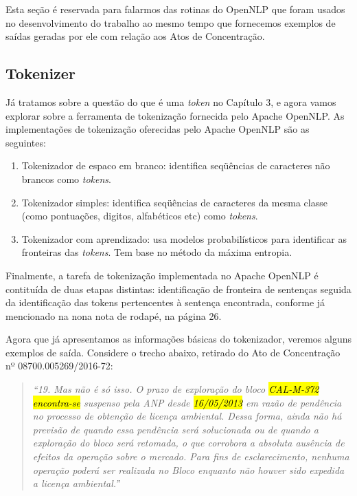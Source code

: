 \documentclass[11pt]{report}
\newcommand{\quotes}[1]{``#1''}
\begin{document}
Esta seção é reservada para falarmos das rotinas do OpenNLP que foram usados no desenvolvimento do trabalho
ao mesmo tempo que fornecemos exemplos de saídas geradas por ele com relação aos Atos de Concentração.


\subsection{Tokenizer}

\indent\indent Já tratamos sobre a questão do que é uma \textit{token} no Capítulo 3, e agora vamos explorar sobre a ferramenta de
tokenização fornecida pelo Apache OpenNLP. As implementações de tokenização oferecidas pelo Apache OpenNLP são as seguintes:

\begin{enumerate}[label=\textbf{{\Roman*.}}]
  \item Tokenizador de espaco em branco: identifica seqüências de caracteres não brancos como \textit{tokens}.
  \item Tokenizador simples: identifica seqüências de caracteres da mesma classe (como pontuações, digitos, alfabéticos etc) como \textit{tokens}.
  \item Tokenizador com aprendizado: usa modelos probabilísticos para identificar as fronteiras das \textit{tokens}. Tem base no método da máxima entropia.
\end{enumerate}

Finalmente, a tarefa de tokenização implementada no Apache OpenNLP é contituída de duas etapas distintas: identificação de fronteira de sentenças seguida da identificação das
tokens pertencentes à sentença encontrada, conforme já mencionado na nona nota de rodapé, na página 26.

Agora que já apresentamos as informações básicas do tokenizador, veremos alguns exemplos de saída. Considere o trecho abaixo, retirado do Ato de Concentração nº 08700.005269/2016-72:

\begin{quote}
  \textit{\quotes{19. Mas não é só isso. O prazo de exploração do bloco \hl{CAL-M-372} \hl{encontra-se} suspenso pela ANP desde \hl{16/05/2013} em razão de pendência no processo de obtenção de licença ambiental. Dessa forma, ainda não há previsão de quando essa pendência será solucionada ou de quando a exploração do bloco será retomada, o que corrobora a absoluta ausência de efeitos da operação sobre o mercado. Para fins de esclarecimento, nenhuma operação poderá ser realizada no Bloco enquanto não houver sido expedida a licença ambiental.}}
\end{quote}
\end{document}
